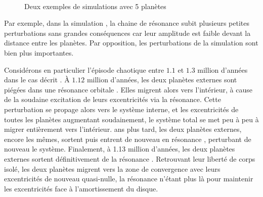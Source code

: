 \begin{figure}[htbp]
\centering
{}\\
\caption{Deux exemples de simulations avec 5 planètes}\label{fig:timed-resonance-stability}
\end{figure}

Par exemple, dans la simulation , la chaine de  résonance subit plusieurs petites perturbations sans grandes conséquences car leur amplitude est faible devant la distance entre les planètes. Par opposition, les perturbations de la simulation   sont bien plus importantes.

Considérons en particulier l'épisode chaotique entre $1.1$ et $1.3$ million d'années dans le cas décrit . À $1.12$ million d'années, les deux planètes externes sont piégées dans une résonance orbitale . Elles migrent alors vers l'intérieur, à cause de la soudaine excitation de leurs excentricités via la résonance. Cette perturbation se propage alors vers le système interne, et les excentricités de toutes les planètes augmentant soudainement, le système total se met peu à peu à migrer entièrement vers l'intérieur.  ans plus tard, les deux planètes externes, encore les mêmes, sortent puis entrent de nouveau en résonance , perturbant de nouveau le système. Finalement, à 1.13 million d'années, les deux planètes externes sortent définitivement de la résonance . Retrouvant leur liberté de corps isolé, les deux planètes migrent vers la zone de convergence avec leurs excentricités de nouveau quasi-nulle, la résonance n'étant plus là pour 
maintenir les 
excentricités face à l'amortissement du disque.

